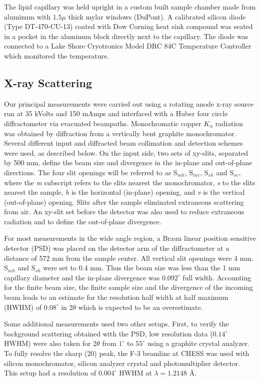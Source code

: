 The lipid capillary was held upright in a custom built sample chamber made from
aluminum with $1.5\mu$ thick mylar windows (DuPont).  A calibrated 
silicon diode (Type DT-470-CU-13) coated with Dow Corning
heat sink compound was seated in a pocket in
the aluminum block directly next to the capillary. The diode was
connected to a Lake Shore Cryotronics Model DRC 84C Temperature
Controller which monitored the temperature.

\subsection*{X-ray Scattering}

Our principal measurements were carried out using a rotating anode x-ray source
run at 35 kVolts and 150 mAmps and interfaced with a Huber four circle
diffractometer via evacuated beampaths.
Monochromatic copper $K_{\alpha}$ radiation was obtained
by diffraction from a vertically bent graphite monochromator.
Several different input and diffracted beam collimation and
detection schemes were used, as described below.  On the input side,
two sets of xy-slits, separated by 500 mm, define the beam size
and divergence in the in-plane and out-of-plane directions.
The four slit openings will be referred to as $\mbox{S}_{mh}$, $\mbox{S}_{mv}$,
 $\mbox{S}_{sh}$ and $\mbox{S}_{sv}$, where the {\em m} subscript refers to the slits
nearest the monochromator, {\em s} to the slits nearest the sample, 
{\em h} is the horizontal (in-plane) opening, and {\em v} is the vertical
(out-of-plane) opening.  Slits after the sample eliminated
extraneous scattering from air.  An xy-slit set before the detector
was also used to reduce extraneous radiation and to define the
out-of-plane divergence.

For most measurements in the wide angle region, a Braun linear
position sensitive detector (PSD) was placed on the detector arm of
the diffractometer at a distance of 572 mm from 
the sample center. All vertical slit openings were 4 mm.  
$\mbox{S}_{mh}$ and $\mbox{S}_{sh}$ were
set to 0.4 mm.  Thus the beam size was less than the 1 mm
capillary diameter and the in-plane divergence was $0.092^{\circ}$ full width.
Accounting for the finite beam size, the finite sample size and the
divergence of the incoming beam leads to an estimate for the resolution
half width at half maximum (HWHM) of $0.08^{\circ}$ in 2$\theta$ which
is expected to be an overestimate.

Some additional measurements used two other setups.  First,
to verify the background scattering obtained with the PSD,
low resolution data ($0.14^{\circ}$ HWHM) were
also taken for 2$\theta$ from $1^{\circ}$ to $55^{\circ}$ using a graphite crystal
analyzer. To fully resolve the sharp (20) peak, the F-3 beamline at CHESS was
used with silicon monochromator, silicon analyzer crystal and
photomultiplier detector. This setup had a resolution of $0.004^{\circ}$ HWHM at $\lambda 
= 1.2148$ \AA.

